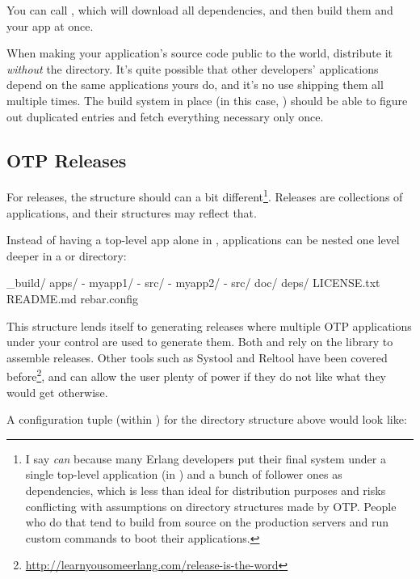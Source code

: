 You can call , which will download all dependencies, and then build them and your app at once.

When making your application's source code public to the world, distribute it \emph{without} the  directory. It's quite possible that other developers' applications depend on the same applications yours do, and it's no use shipping them all multiple times. The build system in place (in this case, ) should be able to figure out duplicated entries and fetch everything necessary only once.

\subsection{OTP Releases}
\label{subsec:building-otp-releases}

For releases, the structure should can a bit different\footnote{I say \emph{can} because many Erlang developers put their final system under a single top-level application (in ) and a bunch of follower ones as dependencies, which is less than ideal for distribution purposes and risks conflicting with assumptions on directory structures made by OTP. People who do that tend to build from source on the production servers and run custom commands to boot their applications.}. Releases are collections of applications, and their structures may reflect that.

Instead of having a top-level app alone in , applications can be nested one level deeper in a  or  directory:

\begin{VerbatimRaw}
_build/
apps/
  - myapp1/
     - src/
  - myapp2/
     - src/
doc/
deps/
LICENSE.txt
README.md
rebar.config
\end{VerbatimRaw}

This structure lends itself to generating releases where multiple OTP applications under your control are used to generate them. Both  and  rely on the  library to assemble releases. Other tools such as Systool and Reltool have been covered before\footnote{\href{http://learnyousomeerlang.com/release-is-the-word}{http://learnyousomeerlang.com/release-is-the-word}}, and can allow the user plenty of power if they do not like what they would get otherwise.

A  configuration tuple (within ) for the directory structure above would look like:


